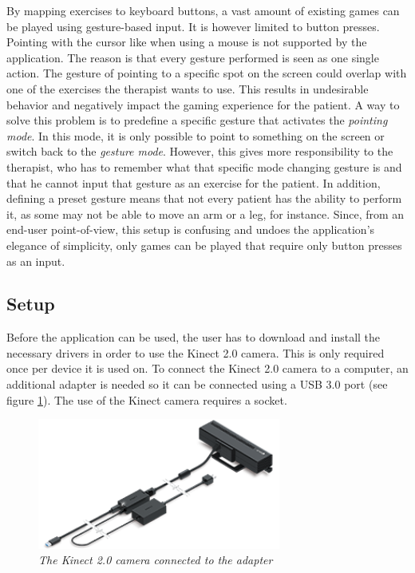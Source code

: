 By mapping exercises to keyboard buttons, a vast amount of existing games can be played using gesture-based input. It is however limited to button presses. Pointing with the cursor like when using a mouse is not supported by the application. The reason is that every gesture performed is seen as one single action. The gesture of pointing to a specific spot on the screen could overlap with one of the exercises the therapist wants to use. This results in undesirable behavior and negatively impact the gaming experience for the patient. A way to solve this problem is to predefine a specific gesture that activates the \emph{pointing mode}. In this mode, it is only possible to point to something on the screen or switch back to the \emph{gesture mode}. However, this gives more responsibility to the therapist, who has to remember what that specific mode changing gesture is and that he cannot input that gesture as an exercise for the patient. In addition, defining a preset gesture means that not every patient has the ability to perform it, as some may not be able to move an arm or a leg, for instance. Since, from an end-user point-of-view, this setup is confusing and undoes the application's elegance of simplicity, only games can be played that require only button presses as an input.\\


\subsection{Setup}

Before the application can be used, the user has to download and install the necessary drivers in order to use the Kinect 2.0 camera. This is only required once per device it is used on. To connect the Kinect 2.0 camera to a computer, an additional adapter is needed so it can be connected using a USB 3.0 port (see figure \ref{fig: kinect}). The use of the Kinect camera requires a socket.\\

\begin{figure}[H]
\begin{center}
\includegraphics[width=8cm]{KinectAdapter.png}
\caption{\emph{The Kinect 2.0 camera connected to the adapter}}
\label{fig: kinect}
\end{center}
\end{figure}

